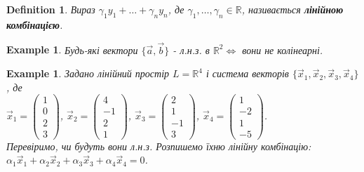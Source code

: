 \documentclass[a4paper, 10pt]{article}
\theoremstyle{theoremdd}
\theoremstyle{theoremdd}
\newtheorem{definition}[theorem]{Definition}
\theoremstyle{theoremdd}
\theoremstyle{theoremdd}
\newtheorem{example}[theorem]{Example}
\theoremstyle{theoremdd}
\theoremstyle{theoremdd}
\theoremstyle{theoremdd}
\theoremstyle{theoremdd}
\begin{document}
	\begin{definition}
	Вираз $\gamma_1 y_1 + \dots + \gamma_n y_n$, де $\gamma_1, \dots, \gamma_n \in \mathbb{R}$, називається \textbf{лінійною комбінацією}.
	\end{definition}
	
	\begin{example}
	Будь-які вектори $\{\vec{a}, \vec{b} \}$ - л.н.з. в $\mathbb{R}^2 \iff $ вони не колінеарні.
	\end{example}
	
	\begin{example}
	Задано лінійний простір $L = \mathbb{R}^4$ і система векторів $\{\vec{x}_1,\vec{x}_2,\vec{x}_3,\vec{x}_4\}$, де\\
	$\vec{x}_1 =\begin{pmatrix} 1\\ 0\\ 2\\ 3 \end{pmatrix} $, $\vec{x}_2 =\begin{pmatrix} 4\\ -1\\ 2\\ 1 \end{pmatrix} $, $\vec{x}_3 =\begin{pmatrix} 2\\ 1\\ -1\\ 3 \end{pmatrix} $, $\vec{x}_4 =\begin{pmatrix} 1\\ -2\\ 1\\ -5 \end{pmatrix}$.\\
	Перевіримо, чи будуть вони л.н.з. Розпишемо їхню лінійну комбінацію:\\
	$\alpha_1 \vec{x}_1 + \alpha_2 \vec{x}_2 + \alpha_3 \vec{x}_3 + \alpha_4 \vec{x}_4 = 0$.\\

\end{example}
\end{document}
